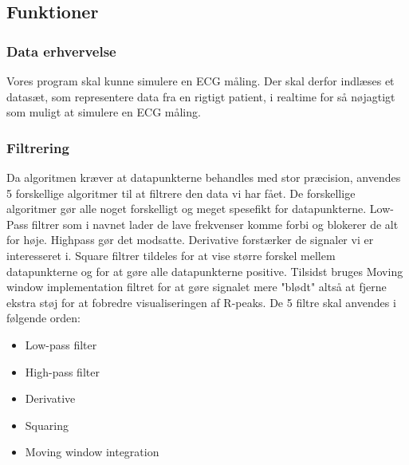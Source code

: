 \documentclass[a4paper,12pt]{article}
\begin{document}
\subsection{Funktioner}
\subsubsection{Data erhvervelse}
Vores program skal kunne simulere en ECG måling. Der skal derfor indlæses et datasæt, som representere data fra en rigtigt patient, i realtime for så nøjagtigt som muligt at simulere en ECG måling.  
\subsubsection{Filtrering}
Da algoritmen kræver at datapunkterne behandles med stor præcision, anvendes 5 forskellige algoritmer til at filtrere den data vi har fået. De forskellige algoritmer gør alle noget forskelligt og meget spesefikt for datapunkterne. Low-Pass filtrer som i navnet lader de lave frekvenser komme forbi og blokerer de alt for høje. Highpass gør det modsatte. Derivative forstærker de signaler vi er interesseret i. Square filtrer tildeles for at vise større forskel mellem datapunkterne og for at gøre alle datapunkterne positive. Tilsidst bruges Moving window implementation filtret for at gøre signalet mere "blødt" altså at fjerne ekstra støj for at fobredre visualiseringen af R-peaks. De 5 filtre skal anvendes i følgende orden:
\begin{itemize}
\item Low-pass filter
\item High-pass filter
\item Derivative
\item Squaring
\item Moving window integration
\end{itemize}
\newpage
\end{document}
